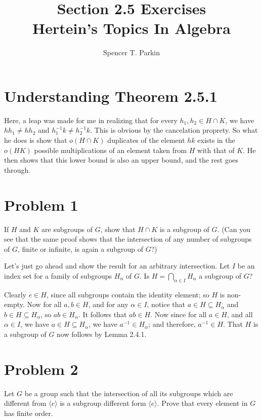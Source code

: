 \documentclass[12pt]{article}
\title{Section 2.5 Exercises\\Hertein's Topics In Algebra}
\author{Spencer T. Parkin}
\begin{document}
\maketitle

\section*{Understanding Theorem 2.5.1}

Here, a leap was made for me in realizing that for every $h_1,h_2\in H\cap K$,
we have $hh_1\neq hh_2$ and $h_1^{-1}k\neq h_2^{-1}k$.  This is obvious by
the cancelation proprety.  So what he does is show that $o(H\cap K)$ duplicates
of the element $hk$ exists in the $o(HK)$ possible multiplications of an element
taken from $H$ with that of $K$.  He then shows that this lower bound is also
an upper bound, and the rest goes through.

\section*{Problem 1}

If $H$ and $K$ are subgroups of $G$, show that $H\cap K$ is a subgroup of $G$.
(Can you see that the same proof shows that the intersection of any
number of subgroups of $G$, finite or infinite, is again a subgroup of $G$?)

Let's just go ahead and show the result for an arbitrary intersection.
Let $I$ be an index set for a family of subgroups $H_\alpha$ of $G$.
Is $H=\bigcap_{\alpha\in I} H_\alpha$ a subgroup of $G$?

Clearly $e\in H$, since all subgroups contain the identity element; so $H$ is non-empty.
Now for all $a,b\in H$, and for any $\alpha\in I$, notice that $a\in H\subseteq H_\alpha$ and $b\in H\subseteq H_\alpha$,
so $ab\in H_\alpha$.  It follows that $ab\in H$.  Now since for all $a\in H$, and all $\alpha\in I$, we
have $a\in H\subseteq H_\alpha$, we have $a^{-1}\in H_\alpha$; and therefore, $a^{-1}\in H$.
That $H$ is a subgroup of $G$ now follows by Lemma 2.4.1.

\section*{Problem 2}

Let $G$ be a group such that the intersection of all its subgroups which
are different from $\langle e\rangle$ is a subgroup different form $\langle e\rangle$.
Prove that every element in $G$ has finite order.
\end{document}

